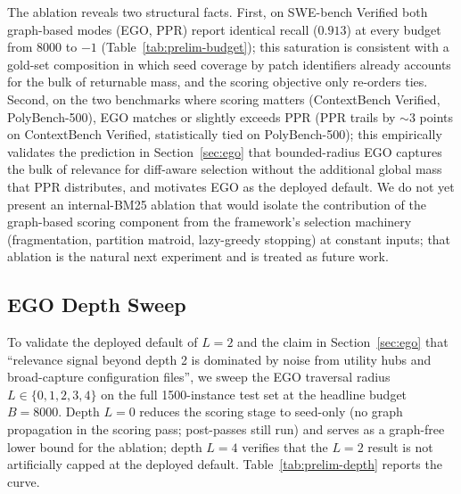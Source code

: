 \documentclass[11pt, a4paper]{article}
\begin{document}
The ablation reveals two structural facts. First, on SWE-bench Verified both graph-based modes (EGO, PPR) report identical recall ($0.913$) at every budget from $8000$ to $-1$ (Table~\ref{tab:prelim-budget}); this saturation is consistent with a gold-set composition in which seed coverage by patch identifiers already accounts for the bulk of returnable mass, and the scoring objective only re-orders ties. Second, on the two benchmarks where scoring matters (ContextBench Verified, PolyBench-500), EGO matches or slightly exceeds PPR (PPR trails by $\sim$3 points on ContextBench Verified, statistically tied on PolyBench-500); this empirically validates the prediction in Section~\ref{sec:ego} that bounded-radius EGO captures the bulk of relevance for diff-aware selection without the additional global mass that PPR distributes, and motivates EGO as the deployed default. We do not yet present an internal-BM25 ablation that would isolate the contribution of the graph-based scoring component from the framework's selection machinery (fragmentation, partition matroid, lazy-greedy stopping) at constant inputs; that ablation is the natural next experiment and is treated as future work.

\subsection{EGO Depth Sweep}
\label{sec:prelim-depth}

To validate the deployed default of $L{=}2$ and the claim in Section~\ref{sec:ego} that ``relevance signal beyond depth 2 is dominated by noise from utility hubs and broad-capture configuration files'', we sweep the EGO traversal radius $L \in \{0, 1, 2, 3, 4\}$ on the full 1500-instance test set at the headline budget $B{=}8000$. Depth $L{=}0$ reduces the scoring stage to seed-only (no graph propagation in the scoring pass; post-passes still run) and serves as a graph-free lower bound for the ablation; depth $L{=}4$ verifies that the $L{=}2$ result is not artificially capped at the deployed default. Table~\ref{tab:prelim-depth} reports the curve.
\end{document}
